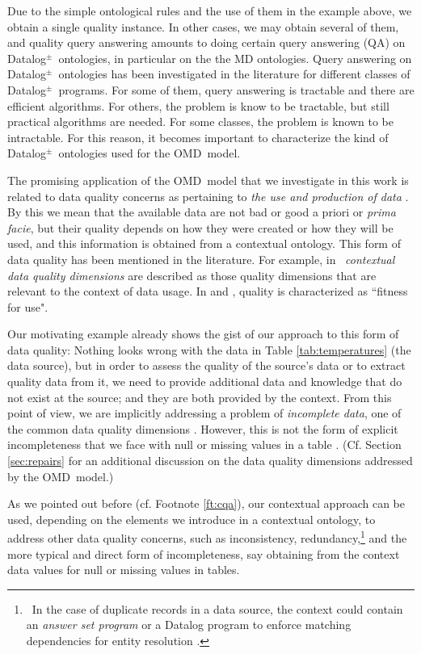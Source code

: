 \documentclass[format=acmsmall, review=false, screen=true]{acmart}
\newcommand{\dpm}{{Datalog}$^\pm$}
\newcommand{\qa}{QA}
\newcommand{\omd}{OMD}
\begin{document}
Due to the simple ontological rules and the use of them in the example above, we obtain a single quality instance. In other cases, we may obtain several of them, and quality query answering amounts to doing certain query answering (\qa) on \dpm \ ontologies, in particular on the the MD ontologies. Query answering on \dpm \ ontologies has been investigated in the literature for different classes of \dpm \ programs. For some of them,
query answering is tractable and there are efficient algorithms. For others, the problem is know to be tractable, but still practical algorithms are needed. For some classes, the problem is known to be intractable. For this reason, it becomes important to characterize the kind of \dpm \ ontologies used for the \omd \ model.



The promising application of the \omd \ model that we investigate in this work is related to data quality concerns as pertaining to {\em the use and production of data} \cite{batini}. By this we mean that the available data are not bad or good a priori or {\em prima facie}, but their quality depends on how they were created or how they  will be used, and this information is obtained from a contextual ontology. This form of data quality has been mentioned in the literature. For example, in~\cite{wang} {\em contextual data quality dimensions} are described  as those quality dimensions that are relevant to the context of data usage. In \cite{herzog} and \cite{juran},  quality is characterized as ``fitness for use".



Our motivating example already shows the gist of our approach to this form of data quality: Nothing looks wrong with the data in Table \ref{tab:temperatures} (the data source), but in order to assess the quality of the source's data or to extract quality data from it, we need to provide additional data and knowledge that do not exist at the source; and they are both provided by the context. From this point of view, we are implicitly addressing a problem of {\em incomplete data}, one of the common data quality dimensions \cite{batini}.
However, this is not the form of explicit incompleteness that we face with null or missing values in a table \cite{libkin}. (Cf. Section \ref{sec:repairs} for an additional discussion on the data quality dimensions addressed by the \omd \ model.)

As we pointed out before (cf. Footnote \ref{ft:cqa}), our contextual approach can be used, depending on the elements we introduce in a contextual ontology, to address other data quality concerns, such as inconsistency, redundancy,\footnote{\ In the case of duplicate records in a data source, the context could contain an {\em answer set program}  or a Datalog program to enforce matching dependencies for entity resolution \cite{kr12}.} and
the more typical and direct form  of incompleteness, say obtaining from the context data values for  null or missing values in tables.
\end{document}
